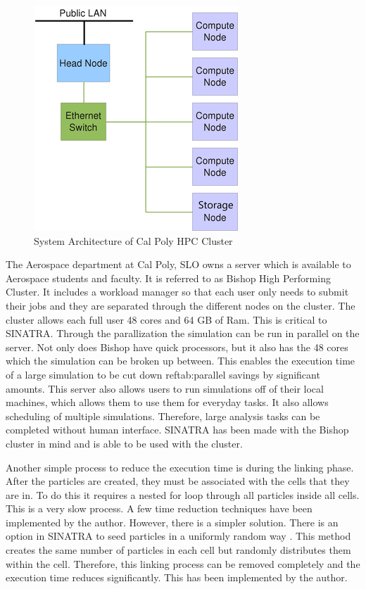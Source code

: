 \begin{figure}
\includegraphics[width=.65\textwidth]{figures/HPC_cluster.png}
\centering
\caption{System Architecture of Cal Poly HPC Cluster\cite{hpc}}
\label{fig:hpccluser}
\end{figure}

\indent The Aerospace department at Cal Poly, SLO owns a server which is available to Aerospace students and faculty. It is referred to as Bishop High Performing Cluster\cite{hpc}. It includes a workload manager so that each user only needs to submit their jobs and they are separated through the different nodes on the cluster. The cluster allows each full user 48 cores and 64 GB of Ram\cite{hpc}. This is critical to SINATRA. Through the parallization the simulation can be run in parallel on the server. Not only does Bishop have quick processors, but it also has the 48 cores which the simulation can be broken up between. This enables the execution time of a large simulation to be cut down ref{tab:parallel savings} by significant amounts. This server also allows users to run simulations off of their local machines, which allows them to use them for everyday tasks. It also allows scheduling of multiple simulations. Therefore, large analysis tasks can be completed without human interface. SINATRA has been made with the Bishop cluster in mind and is able to be used with the cluster. 

\indent Another simple process to reduce the execution time is during the linking phase. After the particles are created, they must be associated with the cells that they are in. To do this it requires a nested for loop through all particles inside all cells. This is a very slow process. A few time reduction techniques have been implemented by the author. However, there is a simpler solution. There is an option in SINATRA to seed particles in a uniformly random way \cite{Galvez2018a}. This method creates the same number of particles in each cell but randomly distributes them within the cell. Therefore, this linking process can be removed completely and the execution time reduces significantly. This has been implemented by the author. \par

